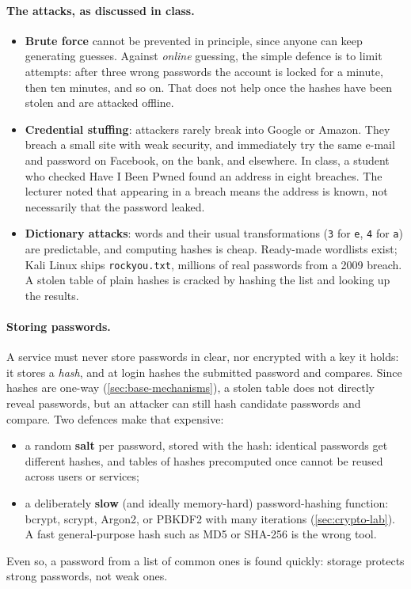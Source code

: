\paragraph{The attacks, as discussed in class.}
\begin{itemize}
    \item \textbf{Brute force} cannot be prevented in principle, since anyone can keep generating guesses. Against \emph{online} guessing, the simple defence is to limit attempts: after three wrong passwords the account is locked for a minute, then ten minutes, and so on. That does not help once the hashes have been stolen and are attacked offline.
    \item \textbf{Credential stuffing}: attackers rarely break into Google or Amazon. They breach a small site with weak security, and immediately try the same e-mail and password on Facebook, on the bank, and elsewhere. In class, a student who checked Have I Been Pwned found an address in eight breaches. The lecturer noted that appearing in a breach means the address is known, not necessarily that the password leaked.
    \item \textbf{Dictionary attacks}: words and their usual transformations (\texttt{3} for \texttt{e}, \texttt{4} for \texttt{a}) are predictable, and computing hashes is cheap. Ready-made wordlists exist; Kali Linux ships \texttt{rockyou.txt}, millions of real passwords from a 2009 breach. A stolen table of plain hashes is cracked by hashing the list and looking up the results.
\end{itemize}

\paragraph{Storing passwords.} A service must never store passwords in clear, nor encrypted with a key it holds: it stores a \emph{hash}, and at login hashes the submitted password and compares. Since hashes are one-way (\cref{sec:base-mechanisms}), a stolen table does not directly reveal passwords, but an attacker can still hash candidate passwords and compare. Two defences make that expensive:
\begin{itemize}
    \item a random \textbf{salt} per password, stored with the hash: identical passwords get different hashes, and tables of hashes precomputed once cannot be reused across users or services;
    \item a deliberately \textbf{slow} (and ideally memory-hard) password-hashing function: bcrypt, scrypt, Argon2, or PBKDF2 with many iterations (\cref{sec:crypto-lab}). A fast general-purpose hash such as MD5 or SHA-256 is the wrong tool.
\end{itemize}
Even so, a password from a list of common ones is found quickly: storage protects strong passwords, not weak ones.


